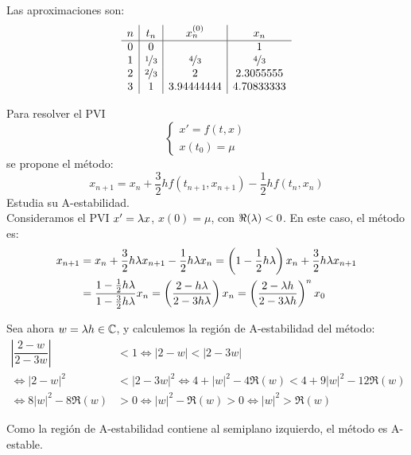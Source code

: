 \begin{ejercicio}
\begin{enumerate}
        Las aproximaciones son:
        \begin{equation*}
            \begin{array}{c|c|c|c}
                n & t_n & x_n^{(0)} & x_n \\
                \hline
                0 & 0 &  & 1\\
                1 & \nicefrac{1}{3} & \nicefrac{4}{3} & \nicefrac{4}{3} \\
                2 & \nicefrac{2}{3} & 2 & 2.3055555 \\
                3 & 1 & 3.94444444 & 4.70833333
            \end{array}
        \end{equation*}
    \end{enumerate}
\end{ejercicio}

\begin{ejercicio}
    Para resolver el PVI
    \begin{equation*}
        \begin{cases}
            x' = f(t, x) \\
            x(t_0) = \mu
        \end{cases}
    \end{equation*}
    se propone el método:
    \begin{equation*}
        x_{n+1} = x_n + \frac{3}{2} h f(t_{n+1}, x_{n+1}) - \frac{1}{2} h f(t_n, x_n)
    \end{equation*}
    Estudia su A-estabilidad.\\


    Consideramos el PVI $x' = \lambda x$, $x(0) = \mu$, con $\Re(\lambda) < 0$. En este caso, el método es:
    \begin{align*}
        x_{n+1} &= x_n + \frac{3}{2} h \lambda x_{n+1} - \frac{1}{2} h \lambda x_n
        = \left(1 - \frac{1}{2} h \lambda\right)x_n + \frac{3}{2} h \lambda x_{n+1} \\
        &= \dfrac{1 - \frac{1}{2} h \lambda}{1 - \frac{3}{2} h \lambda} x_n
        = \left(\dfrac{2 - h \lambda}{2 - 3h \lambda}\right)x_n
        = \left(\dfrac{2 - \lambda h}{2 - 3\lambda h}\right)^n x_0
    \end{align*}

    Sea ahora $w = \lambda h \in \mathbb{C}$, y calculemos la región de A-estabilidad del método:
    \begin{align*}
        \left|\dfrac{2 - w}{2 - 3w}\right| &< 1 \iff |2 - w| < |2 - 3w| \\
        \iff |2 - w|^2 &< |2 - 3w|^2
        \iff 4 + |w|^2 - 4\Re(w) < 4 + 9|w|^2 - 12\Re(w) \\
        \iff 8|w|^2 - 8\Re(w) &> 0 \iff |w|^2 - \Re(w) > 0
        \iff |w|^2 > \Re(w)
    \end{align*}

    Como la región de A-estabilidad contiene al semiplano izquierdo, el método es A-estable.
\end{ejercicio}

